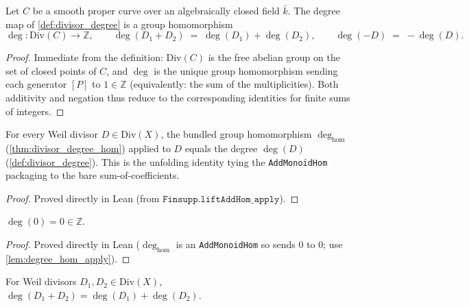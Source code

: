 \begin{theorem}
  \label{thm:divisor_degree_hom}
  Let \(C\) be a smooth proper curve over an algebraically closed field
  \(\bar k\). The degree map of \ref{def:divisor_degree} is a group
  homomorphism
  \[
    \deg \colon \mathrm{Div}(C) \longrightarrow \mathbb Z,
    \qquad
    \deg(D_1 + D_2) \;=\; \deg(D_1) + \deg(D_2),
    \qquad
    \deg(-D) \;=\; -\deg(D).
  \]
\end{theorem}
\begin{proof}
  Immediate from the definition: \(\mathrm{Div}(C)\) is the free abelian group on the
  set of closed points of \(C\), and \(\deg\) is the unique group homomorphism
  sending each generator \([P]\) to \(1 \in \mathbb Z\) (equivalently: the sum
  of the multiplicities). Both additivity and negation thus reduce to the
  corresponding identities for finite sums of integers.
\end{proof}
\begin{lemma}

  \label{lem:degree_hom_apply}
  For every Weil divisor \(D \in \mathrm{Div}(X)\), the bundled group
  homomorphism \(\deg_{\mathrm{hom}}\) (\ref{thm:divisor_degree_hom}) applied
  to \(D\) equals the degree \(\deg(D)\) (\ref{def:divisor_degree}). This is
  the unfolding identity tying the \texttt{AddMonoidHom} packaging to the bare
  sum-of-coefficients.
\end{lemma}
\begin{proof}
  Proved directly in Lean (from \(\texttt{Finsupp.liftAddHom\_apply}\)).
\end{proof}
\begin{lemma}

  \label{lem:degree_zero}
  \(\deg(0) = 0 \in \mathbb Z\).
\end{lemma}
\begin{proof}
  Proved directly in Lean (\(\deg_{\mathrm{hom}}\) is an \texttt{AddMonoidHom}
  so sends \(0\) to \(0\); use \ref{lem:degree_hom_apply}).
\end{proof}
\begin{lemma}

  \label{lem:degree_add}
  For Weil divisors \(D_1, D_2 \in \mathrm{Div}(X)\),
  \(\deg(D_1 + D_2) = \deg(D_1) + \deg(D_2)\).
\end{lemma}
